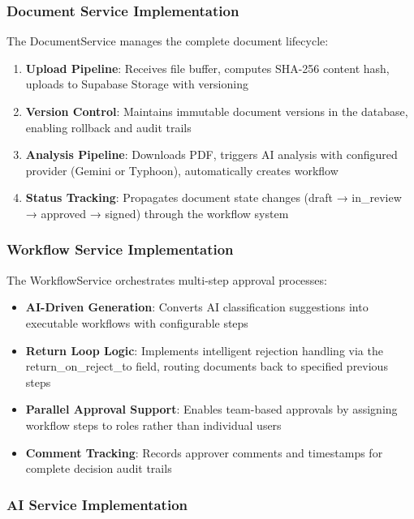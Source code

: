 \documentclass[12pt,oneside,openright,a4paper]{cpe-english-project}
\begin{document}
\subsubsection{Document Service Implementation}

The DocumentService manages the complete document lifecycle:

\begin{enumerate}
    \item \textbf{Upload Pipeline}: Receives file buffer, computes SHA-256 content hash, uploads to Supabase Storage with versioning
    \item \textbf{Version Control}: Maintains immutable document versions in the database, enabling rollback and audit trails
    \item \textbf{Analysis Pipeline}: Downloads PDF, triggers AI analysis with configured provider (Gemini or Typhoon), automatically creates workflow
    \item \textbf{Status Tracking}: Propagates document state changes (draft → in\_review → approved → signed) through the workflow system
\end{enumerate}

\subsubsection{Workflow Service Implementation}

The WorkflowService orchestrates multi-step approval processes:

\begin{itemize}
    \item \textbf{AI-Driven Generation}: Converts AI classification suggestions into executable workflows with configurable steps
    \item \textbf{Return Loop Logic}: Implements intelligent rejection handling via the return\_on\_reject\_to field, routing documents back to specified previous steps
    \item \textbf{Parallel Approval Support}: Enables team-based approvals by assigning workflow steps to roles rather than individual users
    \item \textbf{Comment Tracking}: Records approver comments and timestamps for complete decision audit trails
\end{itemize}

\subsubsection{AI Service Implementation}
\end{document}
